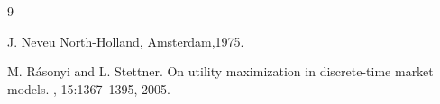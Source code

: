 \documentclass[a4paper]{article}
\begin{document}
\begin{thebibliography}{9}

{J. Neveu} 
\newblock North-Holland, Amsterdam,1975.

 M. R\'asonyi and L. Stettner.
\newblock On utility maximization
in discrete-time market models.
, 15:1367--1395, 2005.

\end{thebibliography}
\end{document}
